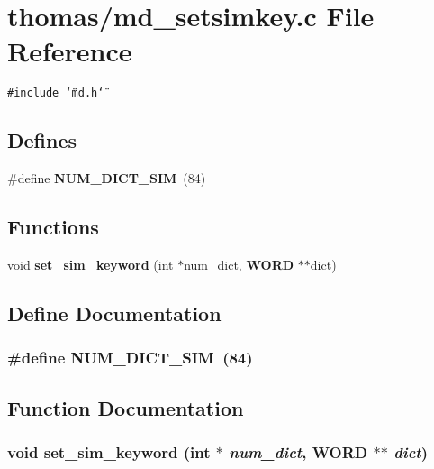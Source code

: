 \section{thomas/md\_\-setsimkey.c File Reference}
\label{thomas_2md__setsimkey_8c}
{\tt \#include \char`\"{}md.h\char`\"{}}\par
\subsection*{Defines}
\begin{CompactItemize}
\item 
\#define {\bf NUM\_\-DICT\_\-SIM}~(84)
\end{CompactItemize}
\subsection*{Functions}
\begin{CompactItemize}
\item 
void {\bf set\_\-sim\_\-keyword} (int $\ast$num\_\-dict, {\bf WORD} $\ast$$\ast$dict)
\end{CompactItemize}


\subsection{Define Documentation}
\subsubsection{\setlength{\rightskip}{0pt plus 5cm}\#define NUM\_\-DICT\_\-SIM~(84)}\label{thomas_2md__setsimkey_8c_96edd8cf3460e2300160ed516397a94a}




\subsection{Function Documentation}
\subsubsection{\setlength{\rightskip}{0pt plus 5cm}void set\_\-sim\_\-keyword (int $\ast$ {\em num\_\-dict}, {\bf WORD} $\ast$$\ast$ {\em dict})}\label{thomas_2md__setsimkey_8c_851f8402f98a05ab3129b643c2d84ca8}


